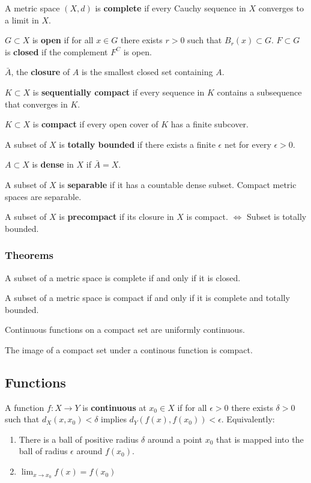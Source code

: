 \documentclass[12pt]{article}
\begin{document}
A metric space $(X, d)$ is \textbf{complete} if every Cauchy sequence in $X$
converges to a limit in $X$.

$G \subset X$ is \textbf{open} if for all $x \in G$ there exists $r > 0$
such that $B_r (x) \subset G$. $F \subset G$ is \textbf{closed} if the complement
$F^C$ is open.

$\bar{A}$, the \textbf{closure} of $A$ is the smallest closed set
containing $A$.

$K \subset X$ is \textbf{sequentially compact} if every sequence in $K$
contains a subsequence that converges in $K$.

$K \subset X$ is \textbf{compact} if every open cover of $K$ has a finite
subcover.

A subset of $X$ is \textbf{totally bounded} if there exists a finite
$\epsilon$ net for every $\epsilon > 0$.

$A \subset X$ is \textbf{dense} in $X$ if $\bar{A} = X$.

A subset of $X$ is \textbf{separable} if it has a countable dense subset.
Compact metric spaces are separable.

A subset of $X$ is \textbf{precompact} if its closure in $X$ is compact. 
$\iff$ Subset is totally bounded.


\subsubsection{Theorems}

A subset of a metric space is complete if and only if it is closed.

A subset of a metric space is compact if and only if it is complete and
totally bounded.

Continuous functions on a compact set are uniformly continuous.

The image of a compact set under a continous function is compact.

\subsection{Functions}

A function $f : X \rightarrow Y$ is \textbf{continuous} at $x_0 \in X$ if
for all $\epsilon > 0$ there exists $\delta > 0$ such that $d_X(x, x_0) <
\delta$ implies $d_Y(f(x), f(x_0)) < \epsilon$. Equivalently:
\begin{enumerate}
    \item There is a ball of positive radius $\delta$
    around a point $x_0$ that is mapped into the ball of radius $\epsilon$ around
    $f(x_0)$.
    \item $\lim_{x \rightarrow x_0} f(x) = f(x_0)$
\end{enumerate}
\end{document}

